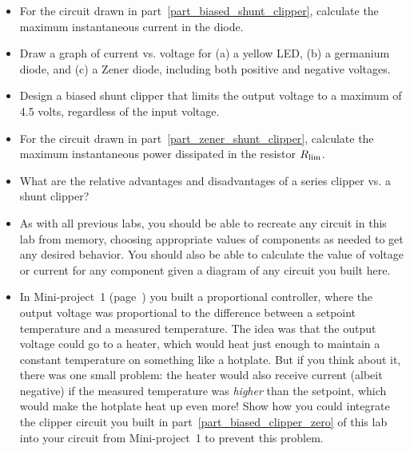 \begin{itemize}

\item For the circuit drawn in part~\ref{part_biased_shunt_clipper}, calculate the maximum instantaneous current in the diode.

\item Draw a graph of current vs. voltage for (a) a yellow LED, (b) a germanium diode, and (c) a Zener diode, including both positive and negative voltages.

\item Design a biased shunt clipper that limits the output voltage to a maximum of 4.5 volts, regardless of the input voltage.

\item For the circuit drawn in part~\ref{part_zener_shunt_clipper}, calculate the maximum instantaneous power dissipated in the resistor $R_{\rm lim}$. 

\item What are the relative advantages and disadvantages of a series clipper vs. a  shunt clipper?

\item As with all previous labs, you should be able to recreate any circuit in this lab from memory, choosing appropriate values of components as needed to get any desired behavior.  You should also be able to calculate the value of voltage or current for any component given a diagram of any circuit you built here.

\item In Mini-project~1 (page~\pageref{lab_proportional_controller}) you built a proportional controller, where the output voltage was proportional to the difference between a setpoint temperature and a measured temperature.  The idea was that the output voltage could go to a heater, which would heat just enough to maintain a constant temperature on something like a hotplate.  But if you think about it, there was one small problem: the heater would also receive current (albeit negative) if the measured temperature was \textit{higher} than the setpoint, which would make the hotplate heat up even more!  Show how you could integrate the clipper circuit you built in part~\ref{part_biased_clipper_zero} of this lab into your circuit from Mini-project~1 to prevent this problem.


\end{itemize}






